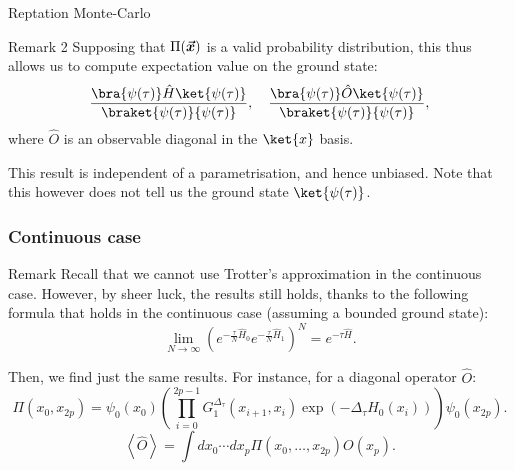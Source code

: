 \documentclass[a4paper]{article}
\begin{document}
\begin{parag}{Reptation Monte-Carlo}
    \begin{subparag}{Remark 2}
        Supposing that $\Pi\left(\bvec{x}\right)$ is a valid probability distribution, this thus allows us to compute expectation value on the ground state: 
        \[\frac{\bra{\psi\left(\tau\right)} \hat{H} \ket{\psi\left(\tau\right)}}{\braket{\psi\left(\tau\right)}{\psi\left(\tau\right)}}, \mathspace \frac{\bra{\psi\left(\tau\right)} \hat{O} \ket{\psi\left(\tau\right)}}{\braket{\psi\left(\tau\right)}{\psi\left(\tau\right)}},\]
        where $\hat{O}$ is an observable diagonal in the $\ket{x}$ basis.

        This result is independent of a parametrisation, and hence unbiased. Note that this however does not tell us the ground state $\ket{\psi\left(\tau\right)}$.
    \end{subparag}
\end{parag}

\subsubsection{Continuous case}

\begin{parag}{Remark}
    Recall that we cannot use Trotter's approximation in the continuous case. However, by sheer luck, the results still holds, thanks to the following formula that holds in the continuous case (assuming a bounded ground state):
    \[\lim_{N \to \infty} \left(e^{- \frac{\tau}{N} \hat{H}_0} e^{-\frac{\tau}{N} \hat{H}_1}\right)^N = e^{- \tau \hat{H}}.\]


    Then, we find just the same results. For instance, for a diagonal operator $\hat{O}$:
    \[\Pi\left(x_0, x_{2p}\right) = \psi_0\left(x_0\right) \left(\prod_{i=0}^{2p-1} G_1^{\Delta_{\tau}}\left(x_{i+1}, x_i\right) \exp\left(- \Delta_{\tau} H_0\left(x_i\right)\right)\right) \psi_0\left(x_{2p}\right).\]
    \[\left\langle \hat{O} \right\rangle = \int d x_0 \cdots dx_p \Pi\left(x_0, \ldots, x_{2p}\right) O\left(x_p\right).\]
\end{parag}
\end{document}
